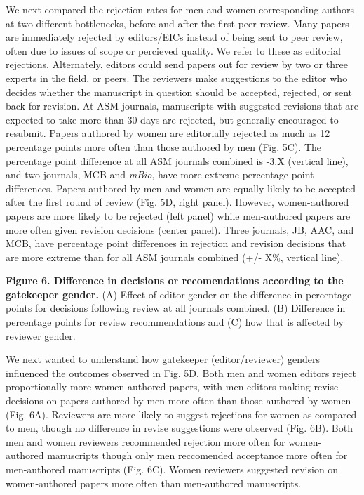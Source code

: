 \documentclass[11pt,]{article}
\begin{document}
We next compared the rejection rates for men and women corresponding
authors at two different bottlenecks, before and after the first peer
review. Many papers are immediately rejected by editors/EICs instead of
being sent to peer review, often due to issues of scope or percieved
quality. We refer to these as editorial rejections. Alternately, editors
could send papers out for review by two or three experts in the field,
or peers. The reviewers make suggestions to the editor who decides
whether the manuscript in question should be accepted, rejected, or sent
back for revision. At ASM journals, manuscripts with suggested revisions
that are expected to take more than 30 days are rejected, but generally
encouraged to resubmit. Papers authored by women are editorially
rejected as much as 12 percentage points more often than those authored
by men (Fig. 5C). The percentage point difference at all ASM journals
combined is -3.X (vertical line), and two journals, MCB and \emph{mBio},
have more extreme percentage point differences. Papers authored by men
and women are equally likely to be accepted after the first round of
review (Fig. 5D, right panel). However, women-authored papers are more
likely to be rejected (left panel) while men-authored papers are more
often given revision decisions (center panel). Three journals, JB, AAC,
and MCB, have percentage point differences in rejection and revision
decisions that are more extreme than for all ASM journals combined (+/-
X\%, vertical line).

\textbf{Figure 6. Difference in decisions or recomendations according to
the gatekeeper gender.} (A) Effect of editor gender on the difference in
percentage points for decisions following review at all journals
combined. (B) Difference in percentage points for review recommendations
and (C) how that is affected by reviewer gender.

We next wanted to understand how gatekeeper (editor/reviewer) genders
influenced the outcomes observed in Fig. 5D. Both men and women editors
reject proportionally more women-authored papers, with men editors
making revise decisions on papers authored by men more often than those
authored by women (Fig. 6A). Reviewers are more likely to suggest
rejections for women as compared to men, though no difference in revise
suggestions were observed (Fig. 6B). Both men and women reviewers
recommended rejection more often for women-authored manuscripts though
only men reccomended acceptance more often for men-authored manuscripts
(Fig. 6C). Women reviewers suggested revision on women-authored papers
more often than men-authored manuscripts.
\end{document}
